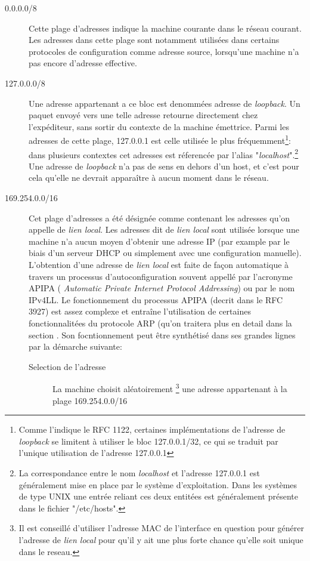 
\begin{description}
\item[0.0.0.0/8]
Cette plage d'adresses indique la machine courante dans le réseau courant.
Les adresses dans cette plage sont notamment utilisées dans certains protocoles de
configuration comme adresse source, lorsqu'une machine n'a pas encore d'adresse effective.

\item[127.0.0.0/8]
Une adresse appartenant a ce bloc est denommées adresse de {\it loopback}.  Un
paquet envoyé vers une telle adresse retourne directement chez l'expéditeur, sans sortir
du contexte de la machine émettrice. Parmi les adresses de cette plage,
127.0.0.1 est celle utilisée le plus fréquemment\footnote{Comme l'indique
le RFC 1122, certaines implémentations de l'adresse de {\it loopback} se
limitent à utiliser le bloc 127.0.0.1/32, ce qui se traduit par l'unique utilisation de
l'adresse 127.0.0.1 }: dans plusieurs contextes cet adresses est réferencée par
l'alias "{\it localhost}".\footnote{La correspondance entre le nom {\it localhost} et
l'adresse 127.0.0.1 est généralement mise en place par le système d'exploitation.
Dans les systèmes de type UNIX une entrée reliant ces deux entitées est généralement
présente dans le fichier "/etc/hosts".}
Une adresse de {\it loopback} n'a pas de sens en dehors
d'un host, et c'est pour cela qu'elle ne devrait apparaître à aucun moment dans le réseau.


\item[169.254.0.0/16]
Cet plage d'adresses a été désignée comme contenant les adresses qu'on appelle
de {\it lien local}.  Les adresses dit de {\it lien local} sont utilisée lorsque
une machine n'a aucun moyen d'obtenir une adresse IP (par example par le biais
d'un serveur DHCP ou simplement avec une configuration manuelle).  L'obtention
d'une adresse de {\it lien local} est faite de façon automatique à travers un
processus d'autoconfiguration souvent appellé par l'acronyme APIPA ({\it
Automatic Private Internet Protocol Addressing}) ou par le nom IPv4LL.  Le
fonctionnement du processus APIPA (decrit dans le RFC 3927) est assez complexe
 et entraîne l'utilisation de certaines fonctionnalitées du
protocole ARP (qu'on traitera plus en detail dans la section %
. Son focntionnement peut être synthétisé dans ses grandes lignes par la démarche suivante:

\begin{description}
\item[Selection de l'adresse]
La machine choisit aléatoirement
    \footnote{Il est conseillé d'utiliser l'adresse MAC de l'interface en question
    pour générer l'adresse de {\it lien local} pour qu'il y ait une plus forte chance
    qu'elle soit unique dans le reseau.} 
une adresse appartenant à la plage 169.254.0.0/16


\end{description}
\end{description}
